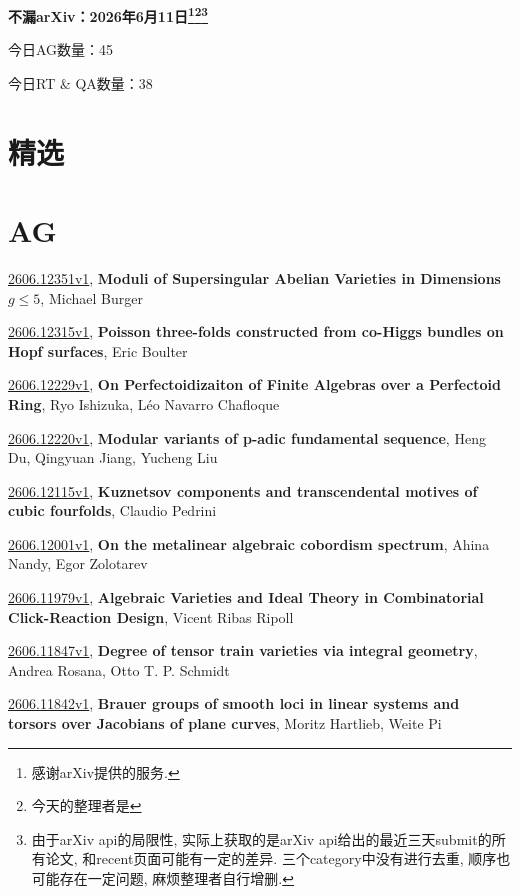 \documentclass[9pt, a4paper]{article}
\theoremstyle{plain}
\theoremstyle{definition}
\theoremstyle{remark}
\newcommand{\arxiv}[3]{\href{https://arxiv.org/abs/#1}{#1}, \textbf{\textcolor{arxivblue}{#2}}, #3}
\newcommand{\AGnumber}{45}
\newcommand{\RTQAnumber}{38}
\newcommand{\NewestDate}{2026年6月11日}
\newcommand{\todayarXiver}{} %
\begin{document}
\begin{center}
    \Huge\textbf{不漏arXiv：\NewestDate\footnote{感谢arXiv提供的服务.}\footnote{今天的整理者是\todayarXiver}\footnote{由于arXiv api的局限性, 实际上获取的是arXiv api给出的最近三天submit的所有论文, 和recent页面可能有一定的差异. 三个category中没有进行去重, 顺序也可能存在一定问题, 麻烦整理者自行增删.}} \\
\end{center}

\setcounter{section}{-1}

\begin{center}
    今日AG数量：\AGnumber
    
    今日RT \& QA数量：\RTQAnumber
    
\end{center}


\section{精选}


\section{AG}
\arxiv{2606.12351v1}{Moduli of Supersingular Abelian Varieties in Dimensions $g\leq 5$}{Michael Burger}

\arxiv{2606.12315v1}{Poisson three-folds constructed from co-Higgs bundles on Hopf surfaces}{Eric Boulter}

\arxiv{2606.12229v1}{On Perfectoidizaiton of Finite Algebras over a Perfectoid Ring}{Ryo Ishizuka, Léo Navarro Chafloque}

\arxiv{2606.12220v1}{Modular variants of p-adic fundamental sequence}{Heng Du, Qingyuan Jiang, Yucheng Liu}

\arxiv{2606.12115v1}{Kuznetsov components and transcendental motives of cubic fourfolds}{Claudio Pedrini}

\arxiv{2606.12001v1}{On the metalinear algebraic cobordism spectrum}{Ahina Nandy, Egor Zolotarev}

\arxiv{2606.11979v1}{Algebraic Varieties and Ideal Theory in Combinatorial Click-Reaction Design}{Vicent Ribas Ripoll}

\arxiv{2606.11847v1}{Degree of tensor train varieties via integral geometry}{Andrea Rosana, Otto T. P. Schmidt}

\arxiv{2606.11842v1}{Brauer groups of smooth loci in linear systems and torsors over Jacobians of plane curves}{Moritz Hartlieb, Weite Pi}
\end{document}
